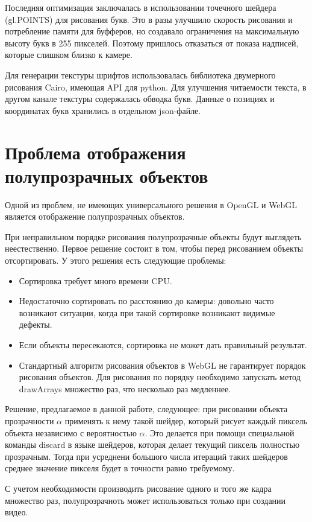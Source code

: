 Последняя оптимизация заключалась в использовании точечного шейдера (gl.POINTS) для рисования букв. Это в разы улучшило скорость рисования и потребление памяти для буфферов, но создавало ограничения на максимальную высоту букв в 255 пикселей. Поэтому пришлось отказаться от показа надписей, которые слишком близко к камере.

Для генерации текстуры шрифтов использовалась библиотека двумерного рисования Cairo, имеющая API для python. Для улучшения читаемости текста, в другом канале текстуры содержалась обводка букв. Данные о позициях и координатах букв хранились в отдельном json-файле.

\section{Проблема отображения полупрозрачных объектов}

Одной из проблем, не имеющих универсального решения в OpenGL и WebGL является отображение полупрозрачных объектов.

При неправильном порядке рисования полупрозрачные объекты будут выглядеть неестественно. Первое решение состоит в том, чтобы перед рисованием объекты отсортировать. У этого решения есть следующие проблемы:

\begin{itemize}
\item Сортировка требует много времени CPU.
\item Недостаточно сортировать по расстоянию до камеры: довольно часто возникают ситуации, когда при такой сортировке возникают видимые дефекты.
\item Если объекты пересекаются, сортировка не может дать правильный результат.
\item Стандартный алгоритм рисования объектов в WebGL не гарантирует порядок рисования объектов. Для рисования по порядку необходимо запускать метод drawArrays множество раз, что несколько раз медленнее.
\end{itemize}

Решение, предлагаемое в данной работе, следующее: при рисовании объекта прозрачности $\alpha$ применять к нему такой шейдер, который рисует каждый пиксель объекта независимо с вероятностью $\alpha$. Это делается при помощи специальной команды discard в языке шейдеров, которая делает текущий пиксель полностью прозрачным. Тогда при усреднени большого числа итераций таких шейдеров среднее значение пикселя будет в точности равно требуемому.

С учетом необходимости производить рисование одного и того же кадра множество раз, полупрозрачноть может использоваться только при создании видео.


